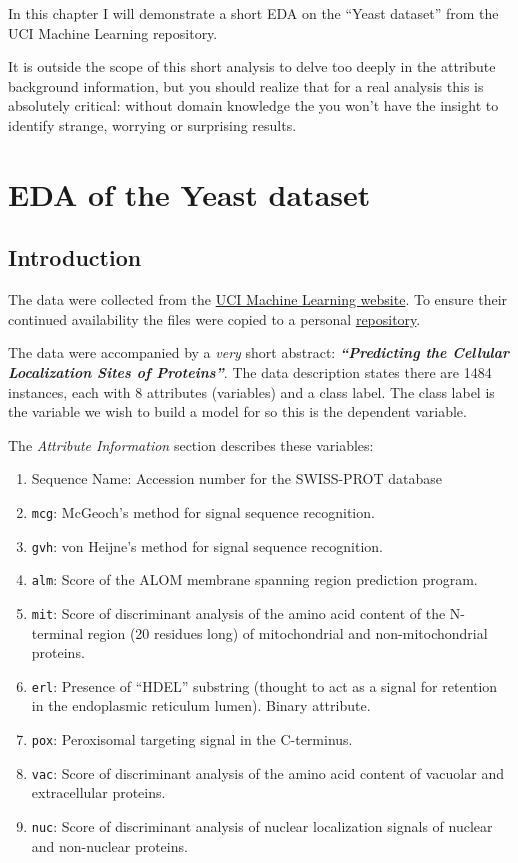 \documentclass[]{book}
\providecommand{\tightlist}{%
  \setlength{\itemsep}{0pt}\setlength{\parskip}{0pt}}
\begin{document}
In this chapter I will demonstrate a short EDA on the ``Yeast dataset'' from the UCI Machine Learning repository.

It is outside the scope of this short analysis to delve too deeply in the attribute background information, but you should realize that for a real analysis this is absolutely critical: without domain knowledge the you won't have the insight to identify strange, worrying or surprising results.

\hypertarget{eda-of-the-yeast-dataset}{%
\section{EDA of the Yeast dataset}\label{eda-of-the-yeast-dataset}}

\hypertarget{introduction-2}{%
\subsection{Introduction}\label{introduction-2}}

The data were collected from the \href{https://archive.ics.uci.edu/ml/datasets/Yeast}{UCI Machine Learning website}. To ensure their continued availability the files were copied to a personal \href{https://github.com/MichielNoback/datasets/tree/master/UCI_yeast_protein_loc}{repository}.

The data were accompanied by a \emph{very} short abstract: \textbf{\emph{``Predicting the Cellular Localization Sites of Proteins''}}. The data description states there are 1484 instances, each with 8 attributes (variables) and a class label. The class label is the variable we wish to build a model for so this is the dependent variable.

The \emph{Attribute Information} section describes these variables:

\begin{enumerate}
\def\labelenumi{\arabic{enumi}.}
\tightlist
\item
  Sequence Name: Accession number for the SWISS-PROT database
\item
  \texttt{mcg}: McGeoch's method for signal sequence recognition.
\item
  \texttt{gvh}: von Heijne's method for signal sequence recognition.
\item
  \texttt{alm}: Score of the ALOM membrane spanning region prediction program.
\item
  \texttt{mit}: Score of discriminant analysis of the amino acid content of the N-terminal region (20 residues long) of mitochondrial and non-mitochondrial proteins.
\item
  \texttt{erl}: Presence of ``HDEL'' substring (thought to act as a signal for retention in the endoplasmic reticulum lumen). Binary attribute.
\item
  \texttt{pox}: Peroxisomal targeting signal in the C-terminus.
\item
  \texttt{vac}: Score of discriminant analysis of the amino acid content of vacuolar and extracellular proteins.
\item
  \texttt{nuc}: Score of discriminant analysis of nuclear localization signals of nuclear and non-nuclear proteins.
\end{enumerate}
\end{document}
